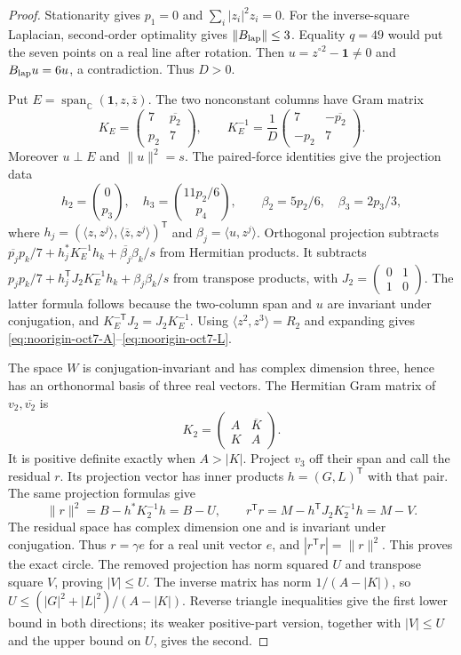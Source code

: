 \documentclass[11pt]{article}
\theoremstyle{remark}
\numberwithin{equation}{section}
\begin{document}
\begin{proof}
Stationarity gives $p_1=0$ and $\sum_i|z_i|^2z_i=0$.
For the inverse-square Laplacian, second-order optimality gives
$\|B_{\rm lap}\|\le3$. Equality $q=49$ would put the seven
points on a real line after rotation. Then
$u=z^{\circ2}-\mathbf1\ne0$ and $B_{\rm lap}u=6u$, a
contradiction. Thus $D>0$.

Put $E=\operatorname{span}_{\mathbb C}(\mathbf1,z,\overline z)$.
The two nonconstant columns have Gram matrix
\[
 K_E=\begin{pmatrix}7&\overline{p_2}\\p_2&7\end{pmatrix},
 \qquad
 K_E^{-1}=\frac1D
       \begin{pmatrix}7&-\overline{p_2}\\-p_2&7\end{pmatrix}.
\]
Moreover $u\perp E$ and $\|u\|^2=s$. The paired-force identities
give the projection data
\[
 h_2=\binom0{p_3},\quad
 h_3=\binom{11p_2/6}{p_4},\qquad
 \beta_2=5p_2/6,\quad\beta_3=2p_3/3,
\]
where $h_j=(\langle z,z^j\rangle,
\langle\overline z,z^j\rangle)^{\mathsf T}$ and
$\beta_j=\langle u,z^j\rangle$. Orthogonal projection subtracts
$\overline{p_j}p_k/7+h_j^*K_E^{-1}h_k+
\overline{\beta_j}\beta_k/s$ from Hermitian products.
It subtracts
$p_jp_k/7+h_j^{\mathsf T}J_2K_E^{-1}h_k+\beta_j\beta_k/s$
from transpose products, with
$J_2=\left(\begin{smallmatrix}0&1\\1&0\end{smallmatrix}\right)$.
The latter formula follows because the two-column span and $u$
are invariant under conjugation, and
$K_E^{-\mathsf T}J_2=J_2K_E^{-1}$.
Using $\langle z^2,z^3\rangle=R_2$ and expanding gives
\eqref{eq:noorigin-oct7-A}--\eqref{eq:noorigin-oct7-L}.

The space $W$ is conjugation-invariant and has complex dimension
three, hence has an orthonormal basis of three real vectors.
The Hermitian Gram matrix of $v_2,\overline{v_2}$ is
\[
 K_2=\begin{pmatrix}A&\overline K\\K&A\end{pmatrix}.
\]
It is positive definite exactly when $A>|K|$. Project $v_3$ off
their span and call the residual $r$. Its projection vector has
inner products $h=(G,L)^{\mathsf T}$ with that pair. The same
projection formulas give
\[
 \|r\|^2=B-h^*K_2^{-1}h=B-U,\qquad
 r^{\mathsf T}r=M-h^{\mathsf T}J_2K_2^{-1}h=M-V.
\]
The residual space has complex dimension one and is invariant
under conjugation. Thus $r=\gamma e$ for a real unit vector $e$,
and $|r^{\mathsf T}r|=\|r\|^2$. This proves the exact circle.
The removed projection has norm squared $U$ and transpose square
$V$, proving $|V|\le U$. The inverse matrix has norm
$1/(A-|K|)$, so $U\le(|G|^2+|L|^2)/(A-|K|)$. Reverse triangle
inequalities give the first lower bound in both directions;
its weaker positive-part version, together with $|V|\le U$ and
the upper bound on $U$, gives the second.
\end{proof}
\end{document}
